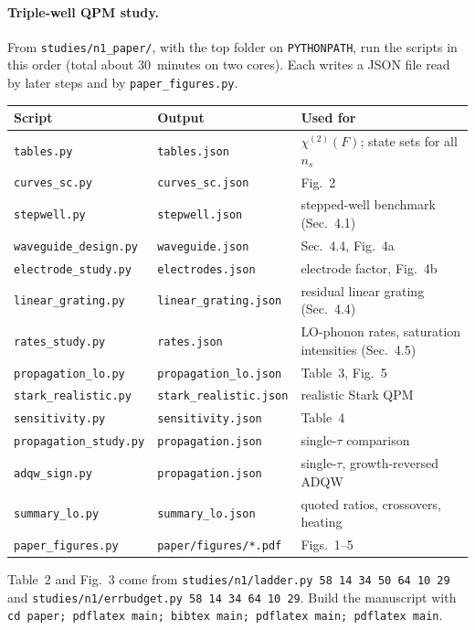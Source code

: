 \documentclass[11pt]{article}
\newcommand{\code}[1]{\texttt{#1}}
\begin{document}
\paragraph{Triple-well QPM study.}
From \code{studies/n1\_paper/}, with the top folder on \code{PYTHONPATH}, run the scripts in this order (total about 30~minutes on two cores). Each writes a JSON file read by later steps and by \code{paper\_figures.py}.
\begin{center}\small
\setlength{\tabcolsep}{4pt}\begin{tabular}{@{}lll@{}}
\toprule
Script & Output & Used for \\ \midrule
\code{tables.py} & \code{tables.json} & $\chi^{(2)}(F)$; state sets for all $n_s$ \\
\code{curves\_sc.py} & \code{curves\_sc.json} & Fig.~2 \\
\code{stepwell.py} & \code{stepwell.json} & stepped-well benchmark (Sec.~4.1) \\
\code{waveguide\_design.py} & \code{waveguide.json} & Sec.~4.4, Fig.~4a \\
\code{electrode\_study.py} & \code{electrodes.json} & electrode factor, Fig.~4b \\
\code{linear\_grating.py} & \code{linear\_grating.json} & residual linear grating (Sec.~4.4) \\
\code{rates\_study.py} & \code{rates.json} & LO-phonon rates, saturation intensities (Sec.~4.5) \\
\code{propagation\_lo.py} & \code{propagation\_lo.json} & Table~3, Fig.~5 \\
\code{stark\_realistic.py} & \code{stark\_realistic.json} & realistic Stark QPM \\
\code{sensitivity.py} & \code{sensitivity.json} & Table~4 \\
\code{propagation\_study.py} & \code{propagation.json} & single-$\tau$ comparison \\
\code{adqw\_sign.py} & \code{propagation.json} & single-$\tau$, growth-reversed ADQW \\
\code{summary\_lo.py} & \code{summary\_lo.json} & quoted ratios, crossovers, heating \\
\code{paper\_figures.py} & \code{paper/figures/*.pdf} & Figs.~1--5 \\ \bottomrule
\end{tabular}
\end{center}
Table~2 and Fig.~3 come from \code{studies/n1/ladder.py 58 14 34 50 64 10 29} and \code{studies/n1/errbudget.py 58 14 34 64 10 29}. Build the manuscript with \code{cd paper; pdflatex main; bibtex main; pdflatex main; pdflatex main}.
\end{document}
